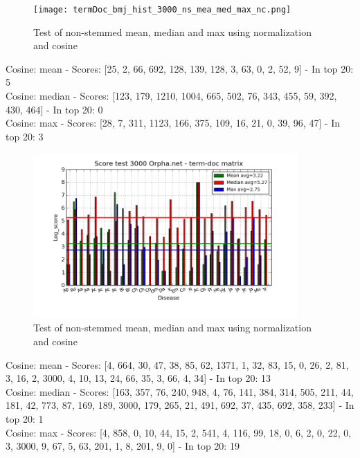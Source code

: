 \begin{figure}[h!]
        \begin{center}
          \texttt{[image: termDoc\_bmj\_hist\_3000\_ns\_mea\_med\_max\_nc.png]}
        \end{center}
        \caption{Test of non-stemmed mean, median and max using normalization and cosine}
        \label{termDoc_bmj_hist_3000_ns_mea_med_max_nc}
\end{figure}
 
Cosine: mean - Scores: [25, 2, 66, 692, 128, 139, 128, 3, 63, 0, 2, 52, 9] - In top 20: 5 \\
Cosine: median - Scores: [123, 179, 1210, 1004, 665, 502, 76, 343, 455, 59, 392, 430, 464] - In top 20: 0 \\
Cosine: max - Scores: [28, 7, 311, 1123, 166, 375, 109, 16, 21, 0, 39, 96, 47] - In top 20: 3

\begin{figure}[h!]
        \begin{center}
          \includegraphics[width=0.9\textwidth]{barcharts/termDoc_orphan_hist_3000_ns_mea_med_max_nc.png}
        \end{center}
        \caption{Test of non-stemmed mean, median and max using normalization and cosine}
        \label{termDoc_orphan_hist_3000_ns_mea_med_max_nc}
\end{figure}
 
Cosine: mean - Scores: [4, 664, 30, 47, 38, 85, 62, 1371, 1, 32, 83, 15, 0, 26, 2, 81, 3, 16, 2, 3000, 4, 10, 13, 24, 66, 35, 3, 66, 4, 34] - In top 20: 13 \\
Cosine: median - Scores: [163, 357, 76, 240, 948, 4, 76, 141, 384, 314, 505, 211, 44, 181, 42, 773, 87, 169, 189, 3000, 179, 265, 21, 491, 692, 37, 435, 692, 358, 233] - In top 20: 1 \\
Cosine: max - Scores: [4, 858, 0, 10, 44, 15, 2, 541, 4, 116, 99, 18, 0, 6, 2, 0, 22, 0, 3, 3000, 9, 67, 5, 63, 201, 1, 8, 201, 9, 0] - In top 20: 19 \\

